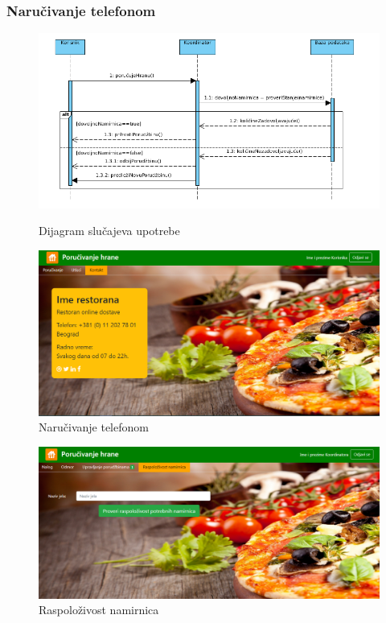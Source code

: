 \subsubsection{Naručivanje telefonom}

\begin{figure}[!h]
    \includegraphics[width=1\textwidth]{slike/DijagramSekvenci.png}\\
    \caption{Dijagram slučajeva upotrebe}
\end{figure}
\begin{figure}[!h]
    \includegraphics[width=1\textwidth]{slike/kontakt.png}
    \caption{Naručivanje telefonom} %
    \label{fig:slika_kontakt}
\end{figure}
\begin{figure}[!h]
    \includegraphics[width=1\textwidth]{slike/raspolozivost_namirnica.png}
    \caption{Raspolo\v zivost namirnica} %
    \label{fig:slika_kontakt}
\end{figure}
